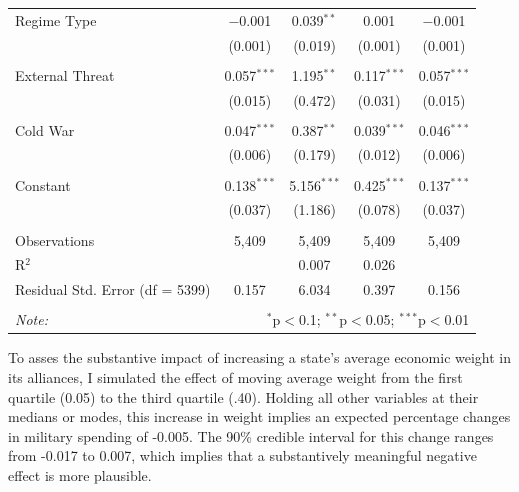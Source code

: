 \documentclass[12pt]{article}
\begin{document}
\begin{table}[!htbp]
\begin{tabular}{@{\extracolsep{5pt}}lcccc}
 Regime Type & $-$0.001 & 0.039$^{**}$ & 0.001 & $-$0.001 \\ 
  & (0.001) & (0.019) & (0.001) & (0.001) \\ 
  & & & & \\ 
 External Threat & 0.057$^{***}$ & 1.195$^{**}$ & 0.117$^{***}$ & 0.057$^{***}$ \\ 
  & (0.015) & (0.472) & (0.031) & (0.015) \\ 
  & & & & \\ 
 Cold War & 0.047$^{***}$ & 0.387$^{**}$ & 0.039$^{***}$ & 0.046$^{***}$ \\ 
  & (0.006) & (0.179) & (0.012) & (0.006) \\ 
  & & & & \\ 
 Constant & 0.138$^{***}$ & 5.156$^{***}$ & 0.425$^{***}$ & 0.137$^{***}$ \\ 
  & (0.037) & (1.186) & (0.078) & (0.037) \\ 
\hline \\[-1.8ex] 
Observations & 5,409 & 5,409 & 5,409 & 5,409 \\ 
R$^{2}$ &  & 0.007 & 0.026 &  \\  
Residual Std. Error (df = 5399) & 0.157 & 6.034 & 0.397 & 0.156 \\ 
\hline 
\hline \\[-1.8ex] 
\textit{Note:}  & \multicolumn{4}{r}{$^{*}$p$<$0.1; $^{**}$p$<$0.05; $^{***}$p$<$0.01} \\ 
\end{tabular} 
\end{table} 

To asses the substantive impact of increasing a state's average economic weight in its alliances, I simulated the effect of moving average weight from the first quartile (0.05) to the third quartile (.40). 
Holding all other variables at their medians or modes, this increase in weight implies an expected percentage changes in military spending of -0.005. 
The 90\% credible interval for this change ranges from -0.017 to 0.007, which implies that a substantively meaningful negative effect is more plausible. 



\newpage
\singlespace


 
\end{document}
